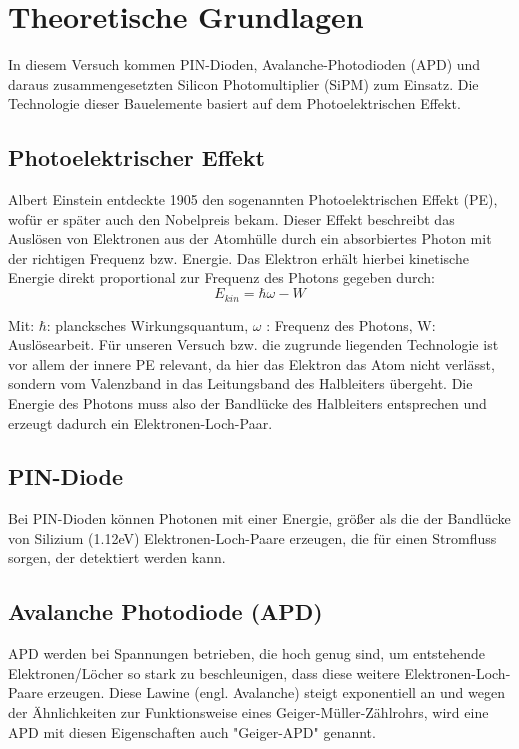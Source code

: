 \documentclass[12pt]{article}
\begin{document}
\section{Theoretische Grundlagen}
In diesem Versuch kommen PIN-Dioden, Avalanche-Photodioden (APD) und daraus zusammengesetzten Silicon Photomultiplier (SiPM) zum Einsatz.
Die Technologie dieser Bauelemente basiert auf dem Photoelektrischen Effekt.

\subsection{Photoelektrischer Effekt}
Albert Einstein entdeckte 1905 den sogenannten Photoelektrischen Effekt (PE), wofür er später auch den Nobelpreis bekam.
Dieser Effekt beschreibt das Auslösen von Elektronen aus der Atomhülle durch ein absorbiertes Photon mit der richtigen Frequenz bzw. Energie.
Das Elektron erhält hierbei kinetische Energie direkt proportional zur Frequenz des Photons gegeben durch:
\begin{equation}
    E_{kin}=\hbar \omega - W
\end{equation}

Mit: $\hbar$: plancksches Wirkungsquantum, $\omega$ : Frequenz des Photons, W: Auslösearbeit.
Für unseren Versuch bzw. die zugrunde liegenden Technologie ist vor allem der innere PE relevant, da hier das Elektron das Atom nicht verlässt, sondern vom Valenzband in das Leitungsband des Halbleiters übergeht.
Die Energie des Photons muss also der Bandlücke des Halbleiters entsprechen und erzeugt dadurch ein Elektronen-Loch-Paar.
\subsection{PIN-Diode}
Bei PIN-Dioden können Photonen mit einer Energie, größer als die der Bandlücke von Silizium (1.12eV) Elektronen-Loch-Paare erzeugen, die für einen Stromfluss sorgen, der detektiert werden kann.

\subsection{Avalanche Photodiode (APD)}
APD werden bei Spannungen betrieben, die hoch genug sind, um entstehende Elektronen/Löcher so stark zu beschleunigen, dass diese weitere Elektronen-Loch-Paare erzeugen.
Diese Lawine (engl. Avalanche) steigt exponentiell an und wegen der Ähnlichkeiten zur Funktionsweise eines Geiger-Müller-Zählrohrs, wird eine APD mit diesen Eigenschaften auch "Geiger-APD" genannt.
\end{document}
